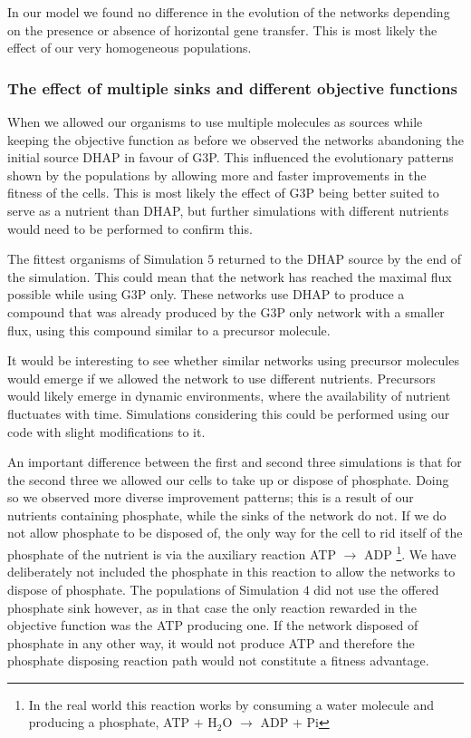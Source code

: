 \documentclass[a4paper,12pt]{article}
\begin{document}
In our model we found no difference in the evolution of the networks depending on the presence or absence of horizontal gene transfer. This is most likely the effect of our very homogeneous populations. 

\subsubsection*{The effect of multiple sinks and different objective functions}
\label{sub:the_effect_of_multiple_sinks}

When we allowed our organisms to use multiple molecules as sources while keeping the objective function as before we observed the networks abandoning the initial source DHAP in favour of G3P. This influenced the evolutionary patterns shown by the populations by allowing more and faster improvements in the fitness of the cells. This is most likely the effect of G3P being better suited to serve as a nutrient than DHAP, but further simulations with different nutrients would need to be performed to confirm this.

The fittest organisms of Simulation $5$ returned to the DHAP source by the end of the simulation. This could mean that the network has reached the maximal flux possible while using G3P only. These networks use DHAP to produce a compound that was already produced by the G3P only network with a smaller flux, using this compound similar to a precursor molecule. 

It would be interesting to see whether similar networks using precursor molecules would emerge if we allowed the network to use different nutrients. Precursors would likely emerge in dynamic environments, where the availability of nutrient fluctuates with time. Simulations considering this could be performed using our code with slight modifications to it. 

An important difference between the first and second three simulations is that for the second three we allowed our cells to take up or dispose of phosphate. Doing so we observed more diverse improvement patterns; this is a result of our nutrients containing phosphate, while the sinks of the network do not. If we do not allow phosphate to be disposed of, the only way for the cell to rid itself of the phosphate of the nutrient is via the auxiliary reaction ATP $\rightarrow$ ADP \footnote{In the real world this reaction works by consuming a water molecule and producing a phosphate, ATP $+$ H$_2$O $\rightarrow$ ADP $+$ Pi}. We have deliberately not included the phosphate in this reaction to allow the networks to dispose of phosphate. The populations of Simulation $4$ did not use the offered phosphate sink however, as in that case the only reaction rewarded in the objective function was the ATP producing one. If the network disposed of phosphate in any other way, it would not produce ATP and therefore the phosphate disposing reaction path would not constitute a fitness advantage.
\end{document}
